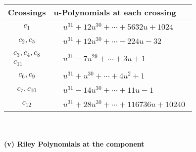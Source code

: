 \documentclass[1p]{elsarticle_modified}
\theoremstyle{definition}
\begin{document}
\begin{tabular}{m{50pt}|m{274pt}}
Crossings & \hspace{64pt}u-Polynomials at each crossing \\
\hline $$\begin{aligned}c_{1}\end{aligned}$$&$\begin{aligned}
&u^{31}+12 u^{30}+\cdots+5632 u+1024
\end{aligned}$\\
\hline $$\begin{aligned}c_{2},c_{5}\end{aligned}$$&$\begin{aligned}
&u^{31}+12 u^{30}+\cdots-224 u-32
\end{aligned}$\\
\hline $$\begin{aligned}c_{3},c_{4},c_{8}\\c_{11}\end{aligned}$$&$\begin{aligned}
&u^{31}-7 u^{29}+\cdots+3 u+1
\end{aligned}$\\
\hline $$\begin{aligned}c_{6},c_{9}\end{aligned}$$&$\begin{aligned}
&u^{31}+u^{30}+\cdots+4 u^2+1
\end{aligned}$\\
\hline $$\begin{aligned}c_{7},c_{10}\end{aligned}$$&$\begin{aligned}
&u^{31}-14 u^{30}+\cdots+11 u-1
\end{aligned}$\\
\hline $$\begin{aligned}c_{12}\end{aligned}$$&$\begin{aligned}
&u^{31}+28 u^{30}+\cdots+116736 u+10240
\end{aligned}$\\
\hline
\end{tabular}\\~\\
\newpage\renewcommand{\arraystretch}{1}
\flushleft \textbf{(v) Riley Polynomials at the component}\newline \\
\end{document}
